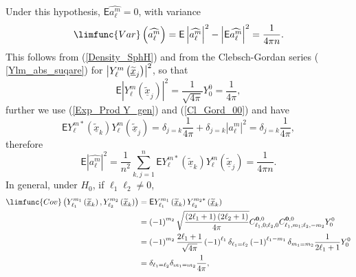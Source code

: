 \documentclass[preprint,11pt,a4paper]{elsarticle}
\begin{document}
Under this hypothesis, $\mathsf{E}\widehat{a_{\ell}^{m}}=0$, with variance 
\begin{equation*}
\limfunc{Var}\left( \widehat{a_{\ell}^{m}}\right) =\mathsf{E}\left\vert 
\widehat{a_{\ell}^{m}}\right\vert ^{2}-\left\vert \mathsf{E}\widehat{%
a_{\ell}^{m}}\right\vert ^{2}=\frac{1}{4\pi n}.
\end{equation*}
This follows from (\ref{Density_SphH}) and from the Clebsch-Gordan series (%
\ref{Ylm_abs_suqare}) for $\left\vert Y_{\ell}^{m}\left( \underline{%
\widetilde{x}}_{j}\right) \right\vert ^{2}$, so that 
\begin{equation*}
\mathsf{E}\left\vert Y_{\ell}^{m}\left( \underline{\widetilde{x}}_{j}\right)
\right\vert ^{2}=\frac{1}{\sqrt{4\pi}}Y_{0}^{0}=\frac{1}{4\pi},
\end{equation*}
further we use (\ref{Exp_Prod Y_gen}) and (\ref{Cl_Gord_00}) and have 
\begin{equation*}
\mathsf{E}Y_{\ell}^{m\ast}\left( \underline{\widetilde{x}}_{k}\right)
Y_{\ell}^{m}\left( \underline{\widetilde{x}}_{j}\right) =\delta_{j=k}\frac{1%
}{4\pi}+\delta_{j=k}\left\vert a_{\ell}^{m}\right\vert ^{2}=\delta_{j=k}%
\frac{1}{4\pi},
\end{equation*}
therefore%
\begin{equation*}
\mathsf{E}\left\vert \widehat{a_{\ell}^{m}}\right\vert ^{2}=\frac{1}{n^{2}}%
\sum_{k,j=1}^{n}\mathsf{E}Y_{\ell}^{m\ast}\left( \underline{\widetilde{x}}%
_{k}\right) Y_{\ell}^{m}\left( \underline{\widetilde{x}}_{j}\right) =\frac{1%
}{4\pi n}.
\end{equation*}
In general, under $H_{0}$, if $\ell_{1}\ell_{2}\neq0$, 
\begin{align*}
\limfunc{Cov}\left( Y_{\ell_{1}}^{m_{1}}\left( \underline{\widetilde{x}}%
_{k}\right) ,Y_{\ell_{2}}^{m_{2}}\left( \underline{\widetilde{x}}_{k}\right)
\right) & =\mathsf{E}Y_{\ell_{1}}^{m_{1}}\left( \underline{\widetilde{x}}%
_{k}\right) Y_{\ell_{2}}^{m_{2}\ast}\left( \underline{\widetilde{x}}%
_{k}\right) \\
& =\left( -1\right) ^{m_{2}}\sqrt{\frac{\left( 2\ell_{1}+1\right) \left(
2\ell_{2}+1\right) }{4\pi}}C_{\ell_{1},0;\ell_{2},0}^{\boldsymbol{0}%
,0}C_{\ell_{1},m_{1};\ell_{2},-m_{2}}^{\boldsymbol{0},0}Y_{0}^{0} \\
& =\left( -1\right) ^{m_{2}}\frac{2\ell_{1}+1}{\sqrt{4\pi}}\left( -1\right)
^{\ell_{1}}\delta_{\ell_{1}=\ell_{2}}\left( -1\right) ^{\ell
_{1}-m_{1}}\delta_{m_{1}=m_{2}}\frac{1}{2\ell_{1}+1}Y_{0}^{0} \\
& =\delta_{\ell_{1}=\ell_{2}}\delta_{m_{1}=m_{2}}\frac{1}{4\pi},
\end{align*}
\end{document}
